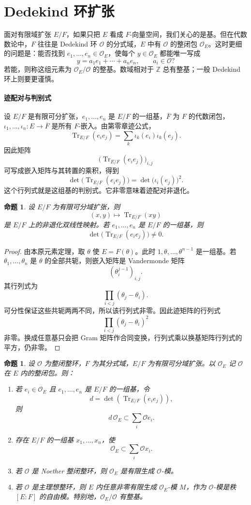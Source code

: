 \documentclass[11pt,a4paper,openany]{ctexbook}
\numberwithin{equation}{chapter}
\newcommand{\Z}{\mathbb{Z}}
\newcommand{\Tr}{\operatorname{Tr}}
\theoremstyle{plain}
\newtheorem{proposition}[theorem]{命题}
\theoremstyle{definition}
\theoremstyle{remark}
\begin{document}
\section{Dedekind 环扩张}
面对有限域扩张 $E/F$，如果只把 $E$ 看成 $F$-向量空间，我们关心的是基。但在代数数论中，$F$ 往往是 Dedekind 环 $\mathcal O$ 的分式域，$E$ 中有 $\mathcal O$ 的整闭包 $\mathcal O_E$。这时更细的问题是：能否找到 $e_1,\dots,e_n\in\mathcal O_E$，使每个 $y\in\mathcal O_E$ 都能唯一写成
\[
y=a_1e_1+\cdots+a_ne_n,\qquad a_i\in\mathcal O?
\]
若能，则称这组元素为 $\mathcal O_E/\mathcal O$ 的整基。数域相对于 $\Z$ 总有整基；一般 Dedekind 环上则要更谨慎。

\paragraph{迹配对与判别式}
设 $E/F$ 是有限可分扩张，$e_1,\dots,e_n$ 是 $E/F$ 的一组基，$\overline F$ 为 $F$ 的代数闭包，$\iota_1,\dots,\iota_n:E\to\overline F$ 是所有 $F$-嵌入。由第零章迹公式，
\[
\Tr_{E/F}(e_i e_j)=\sum_k \iota_k(e_i)\iota_k(e_j).
\]
因此矩阵
\[
\bigl(\Tr_{E/F}(e_i e_j)\bigr)_{i,j}
\]
可写成嵌入矩阵与其转置的乘积，得到
\[
\det\bigl(\Tr_{E/F}(e_i e_j)\bigr)
=\det\bigl(\iota_i(e_j)\bigr)^2.
\]
这个行列式就是这组基的判别式。它非零意味着迹配对非退化。

\begin{proposition}
设 $E/F$ 为有限可分域扩张，则
\[
(x,y)\longmapsto \Tr_{E/F}(xy)
\]
是 $E/F$ 上的非退化双线性映射。若 $e_1,\dots,e_n$ 是 $E/F$ 的一组基，则
\[
\det\bigl(\Tr_{E/F}(e_i e_j)\bigr)\ne0.
\]
\end{proposition}

\begin{proof}
由本原元素定理，取 $\theta$ 使 $E=F(\theta)$。此时 $1,\theta,\dots,\theta^{n-1}$ 是一组基。若 $\theta_1,\dots,\theta_n$ 是 $\theta$ 的全部共轭，则嵌入矩阵是 Vandermonde 矩阵
\[
(\theta_i^{j-1})_{i,j}.
\]
其行列式为
\[
\prod_{i<j}(\theta_j-\theta_i).
\]
可分性保证这些共轭两两不同，所以该行列式非零。因此迹矩阵的行列式
\[
\prod_{i<j}(\theta_j-\theta_i)^2
\]
非零。换成任意基只会把 Gram 矩阵作合同变换，行列式乘以换基矩阵行列式的平方，仍非零。
\end{proof}

\begin{proposition}
设 $\mathcal O$ 为整闭整环，$F$ 为其分式域，$E/F$ 为有限可分域扩张。以 $\mathcal O_E$ 记 $\mathcal O$ 在 $E$ 内的整闭包。则：
\begin{enumerate}[label=(\arabic*)]
\item 若 $e_i\in\mathcal O_E$ 且 $e_1,\dots,e_n$ 是 $E/F$ 的一组基，令
\[
d=\det(\Tr_{E/F}(e_i e_j)),
\]
则
\[
d\,\mathcal O_E\subset \sum_i\mathcal O e_i.
\]
\item 存在 $E/F$ 的一组基 $x_1,\dots,x_n$，使
\[
\mathcal O_E\subset \sum_i\mathcal O x_i.
\]
\item 若 $\mathcal O$ 是 Noether 整闭整环，则 $\mathcal O_E$ 是有限生成 $\mathcal O$-模。
\item 若 $\mathcal O$ 是主理想整环，则 $E$ 内任意非零有限生成 $\mathcal O_E$-模 $M$，作为 $\mathcal O$-模是秩 $[E:F]$ 的自由模。特别地，$\mathcal O_E/\mathcal O$ 有整基。
\end{enumerate}
\end{proposition}
\end{document}
